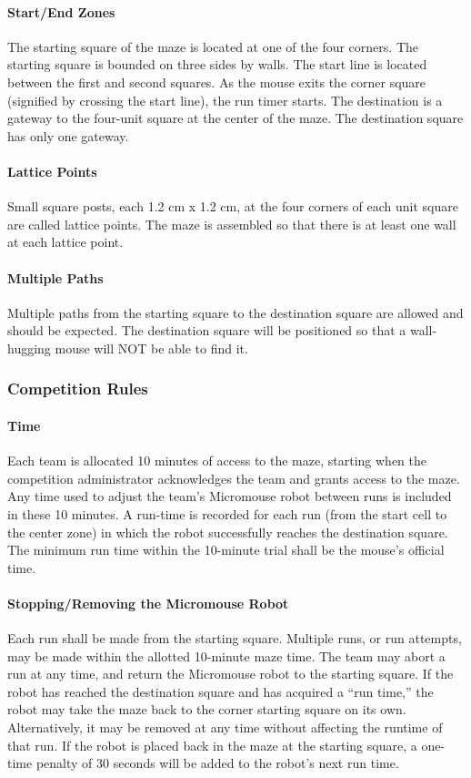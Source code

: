\documentclass[12pt]{article}
\begin{document}
\paragraph{Start/End Zones}
The starting square of the \gls{maze} is located at one of the four corners. The starting square
is bounded on three sides by walls. The start line is located between the first and second
squares. As the mouse exits the corner square (signified by crossing the start line), the
run timer starts. The destination is a gateway to the four-unit square at the center of the
\gls{maze}. The destination square has only one gateway.
\paragraph{Lattice Points}
Small square posts, each 1.2 cm x 1.2 cm, at the four corners of each unit square are
called lattice points. The \gls{maze} is assembled so that there is at least one wall at each
lattice point.
\paragraph{Multiple Paths}
Multiple paths from the starting square to the destination square are allowed and
should be expected. The destination square will be positioned so that a wall-hugging
mouse will NOT be able to find it.
\subsubsection{Competition Rules} \label{Competition Rules}
\paragraph{Time}
Each team is allocated 10 minutes of access to the \gls{maze}, starting when the competition
administrator acknowledges the team and grants access to the \gls{maze}. Any time used to
adjust the team’s \gls{Micromouse} robot between runs is included in these 10 minutes. A
run-time is recorded for each run (from the start cell to the center zone) in which the
robot successfully reaches the destination square. The minimum run time within the 10-minute trial
shall be the mouse’s official time.
\paragraph{Stopping/Removing the \gls{Micromouse} Robot}
Each run shall be made from the starting square. Multiple runs, or run attempts, may be
made within the allotted 10-minute \gls{maze} time. The team may abort a run at any time,
and return the \gls{Micromouse} robot to the starting square. If the robot has reached the
destination square and has acquired a “run time,” the robot may take the \gls{maze} back to
the corner starting square on its own. Alternatively, it may be removed at any time
without affecting the runtime of that run. If the robot is placed back in the \gls{maze} at the
starting square, a one-time penalty of 30 seconds will be added to the robot’s next run
time.
\end{document}
